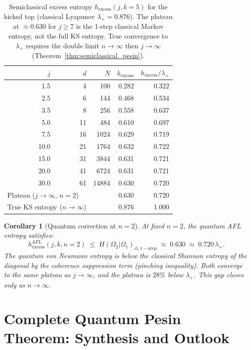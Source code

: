 \documentclass[12pt,a4paper]{article}
\newtheorem{corollary}[theorem]{Corollary}
\begin{document}
\begin{table}[h!]
\centering
\caption{Semiclassical excess entropy $h_{\mathrm{excess}}(j, k=5)$
for the kicked top (classical Lyapunov $\lambda_+ = 0.876$).
The plateau at $\approx 0.630$ for $j \geq 7$ is the 1-step classical
Markov entropy, not the full KS entropy.
True convergence to $\lambda_+$ requires the double limit $n \to \infty$
then $j \to \infty$ (Theorem~\ref{thm:semiclassical_pesin}).}
\label{tab:semiclassical_plateau}
\begin{tabular}{r|r|r|r|r}
\hline
$j$ & $d$ & $N$ & $h_{\mathrm{excess}}$ & $h_{\mathrm{excess}}/\lambda_+$ \\
\hline
 1.5 &   4 &   100 & 0.282 & 0.322 \\
 2.5 &   6 &   144 & 0.468 & 0.534 \\
 3.5 &   8 &   256 & 0.558 & 0.637 \\
 5.0 &  11 &   484 & 0.610 & 0.697 \\
 7.5 &  16 &  1024 & 0.629 & 0.719 \\
10.0 &  21 &  1764 & 0.632 & 0.722 \\
15.0 &  31 &  3844 & 0.631 & 0.721 \\
20.0 &  41 &  6724 & 0.631 & 0.721 \\
30.0 &  61 & 14884 & 0.630 & 0.720 \\
\hline
\multicolumn{2}{l|}{Plateau ($j\to\infty$, $n=2$)} & & 0.630 & 0.720 \\
\multicolumn{2}{l|}{True KS entropy ($n\to\infty$)} & & 0.876 & 1.000 \\
\hline
\end{tabular}
\end{table}

\begin{corollary}[Quantum correction at $n=2$]
  \label{cor:quantum_correction_n2}
  At fixed $n=2$, the quantum AFL entropy satisfies:
  \[
    h_{\mathrm{excess}}^{\mathrm{AFL}}(j, k, n=2)
    \;\leq\; H(\Omega_2|\Omega_1)_{\mathrm{cl, 1-step}}
    \;\approx\; 0.630 \;\approx\; 0.720\,\lambda_+.
  \]
  The quantum von Neumann entropy is below the classical Shannon entropy
  of the diagonal by the coherence suppression term (pinching inequality).
  Both converge to the same plateau as $j \to \infty$, and the plateau is
  $28\%$ below $\lambda_+$.  This gap closes only as $n \to \infty$.
\end{corollary}

\section{Complete Quantum Pesin Theorem: Synthesis and Outlook}
\label{sec:qp_synthesis_final}
\end{document}
